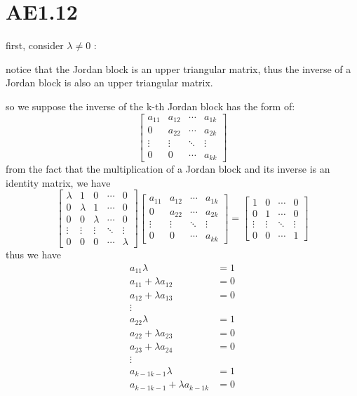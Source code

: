 \documentclass[12pt,a4paper]{article}
\begin{document}
\section{AE1.12}
first, consider $\lambda \neq 0$ :

notice that the Jordan block is an upper triangular matrix, 
thus the inverse of a Jordan block is also an upper triangular matrix.

so we suppose the inverse of the k-th Jordan block has the form of:
\[
    \begin{bmatrix}
        a_{11} & a_{12} & \cdots & a_{1k} \\
        0      & a_{22} & \cdots & a_{2k} \\
        \vdots & \vdots & \ddots & \vdots \\
        0      & 0      & \cdots & a_{kk}

    \end{bmatrix}
\]
from the fact that the multiplication of a Jordan block and its inverse is an identity matrix, we have
\[
    \begin{bmatrix}
        \lambda & 1      & 0      & \cdots & 0      \\
        0       & \lambda & 1      & \cdots & 0      \\
        0       & 0      & \lambda & \cdots & 0      \\
        \vdots  & \vdots & \vdots & \ddots & \vdots \\
        0       & 0      & 0      & \cdots & \lambda
    \end{bmatrix} \begin{bmatrix}
        a_{11} & a_{12} & \cdots & a_{1k} \\
        0      & a_{22} & \cdots & a_{2k} \\
        \vdots & \vdots & \ddots & \vdots \\
        0      & 0      & \cdots & a_{kk}
    \end{bmatrix} = \begin{bmatrix}
        1 & 0 & \cdots & 0 \\
        0 & 1 & \cdots & 0 \\
        \vdots & \vdots & \ddots & \vdots \\
        0 & 0 & \cdots & 1
    \end{bmatrix}
\]
thus we have
\[
    \begin{aligned}
        a_{11} \lambda & = 1 \\
        a_{11} + \lambda a_{12} & = 0 \\
        a_{12} + \lambda a_{13} & = 0 \\
        \vdots & \\
        a_{22} \lambda & = 1 \\
        a_{22} + \lambda a_{23} &= 0 \\
        a_{23} + \lambda a_{24} &= 0 \\
        \vdots & \\
        a_{k-1 k-1} \lambda & = 1 \\
        a_{k-1 k-1} + \lambda a_{k-1 k} &= 0 \\
    \end{aligned}
\]
\end{document}
